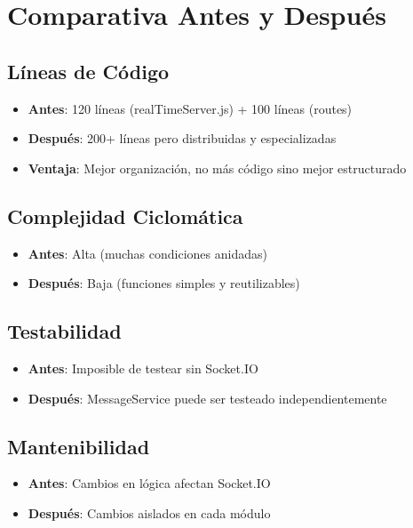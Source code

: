 \documentclass[12pt,a4paper]{article}
\begin{document}
\newpage

\section{Comparativa Antes y Después}

\subsection{Líneas de Código}
\begin{itemize}
    \item \textbf{Antes}: 120 líneas (realTimeServer.js) + 100 líneas (routes)
    \item \textbf{Después}: 200+ líneas pero distribuidas y especializadas
    \item \textbf{Ventaja}: Mejor organización, no más código sino mejor estructurado
\end{itemize}

\subsection{Complejidad Ciclomática}
\begin{itemize}
    \item \textbf{Antes}: Alta (muchas condiciones anidadas)
    \item \textbf{Después}: Baja (funciones simples y reutilizables)
\end{itemize}

\subsection{Testabilidad}
\begin{itemize}
    \item \textbf{Antes}: Imposible de testear sin Socket.IO
    \item \textbf{Después}: MessageService puede ser testeado independientemente
\end{itemize}

\subsection{Mantenibilidad}
\begin{itemize}
    \item \textbf{Antes}: Cambios en lógica afectan Socket.IO
    \item \textbf{Después}: Cambios aislados en cada módulo
\end{itemize}
\end{document}
